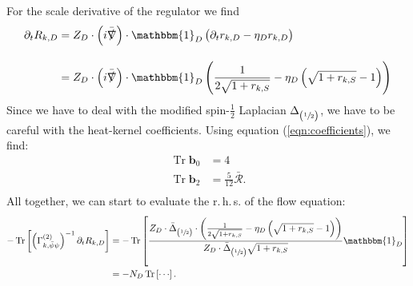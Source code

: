 For the scale derivative of the regulator we find
\begin{equation}
\begin{aligned}
	\partial_tR_{k,D} &=  
	Z_D\cdot\left(i\bar{\slashed{\nabla}}\right)\cdot\mathbbm{1}_D\left(\partial_t r_{k,D} - \eta_D r_{k,D}\right) \\[10pt]
	&=Z_D\cdot\left(i\bar{\slashed{\nabla}}\right)\cdot\mathbbm{1}_D\left(\frac{1}{2\sqrt{1+r_{k, S}}} - \eta_D\left(\sqrt{1+r_{k,S}} -1\right)\right)
\end{aligned} 
\end{equation}
Since we have to deal with the modified spin-$\frac{1}{2}$ Laplacian $\Delta_{\left(\sfrac{1}{2}\right)}$, we have to be careful with the heat-kernel coefficients. Using equation (\ref{eqn:coefficients}), we find:
\begin{equation}
\begin{aligned}
	\operatorname{Tr}\mathbf{b}_0 &= 4 \\
	\operatorname{Tr}\mathbf{b}_2 &= \frac{5}{12}\bar{\mathcal{R}}. \\
\end{aligned} 
\end{equation}
All together, we can start to evaluate the r.\,h.\,s. of the flow equation:
\begin{equation}
\begin{aligned}
	-\tr{\left(\Gamma^{(2)}_{k, \bar{\psi}\psi}\right)^{-1}\partial_t R_{k,D}} &=-\tr{\frac{Z_D\cdot\bar{\Delta}_{\left(\sfrac{1}{2}\right)}\cdot\left(\frac{1}{2\sqrt{1+r_{k, S}}} - \eta_D\left(\sqrt{1+r_{k,S}} -1\right)\right)}{Z_D\cdot\bar{\Delta}_{\left(\sfrac{1}{2}\right)}\sqrt{1 + r_{k,S}}}\mathbbm{1}_D} \\
	&=   -N_D\tr{\cdots}.
\end{aligned}
\end{equation}


